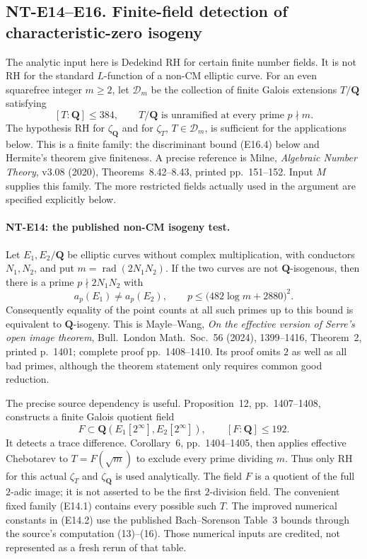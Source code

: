 \subsection*{NT-E14--E16. Finite-field detection of characteristic-zero isogeny}

The analytic input here is Dedekind RH for certain finite
number fields. It is not RH for the standard $L$-function
of a non-CM elliptic curve.
For an even squarefree integer $m\ge2$, let
$\mathcal D_m$ be the collection of finite Galois
extensions $T/\mathbf Q$ satisfying
\[
 [T:\mathbf Q]\le384,\qquad
 T/\mathbf Q\text{ is unramified at every prime }p\nmid m.
 \tag{E14.1}
\]
The hypothesis RH for $\zeta_{\mathbf Q}$ and for
$\zeta_T$, $T\in\mathcal D_m$, is sufficient for the
applications below. This is a finite family: the
discriminant bound (E16.4) below and Hermite's theorem
give finiteness. A precise reference is Milne,
\emph{Algebraic Number Theory}, v3.08 (2020),
Theorems~8.42--8.43, printed pp.~151--152.
Input $M$ supplies this family.
The more restricted fields actually used in the
argument are specified explicitly below.

\paragraph{NT-E14: the published non-CM isogeny test.}
Let $E_1,E_2/\mathbf Q$ be elliptic curves without
complex multiplication, with conductors $N_1,N_2$,
and put $m=\operatorname{rad}(2N_1N_2)$.
If the two curves are not $\mathbf Q$-isogenous,
then there is a prime $p\nmid2N_1N_2$ with
\[
 a_p(E_1)\ne a_p(E_2),\qquad
 p\le \bigl(482\log m+2880\bigr)^2.
 \tag{E14.2}
\]
Consequently equality of the point counts at all
such primes up to this bound is equivalent to
$\mathbf Q$-isogeny.
This is Mayle--Wang, \emph{On the effective version
of Serre's open image theorem},
Bull.\ London Math.\ Soc.~56 (2024), 1399--1416,
Theorem~2, printed p.~1401; complete proof
pp.~1408--1410. Its proof omits $2$ as well as all
bad primes, although the theorem statement only
requires common good reduction.

The precise source dependency is useful. Proposition~12,
pp.~1407--1408, constructs a finite Galois quotient field
\[
 F\subset\mathbf Q(E_1[2^\infty],E_2[2^\infty]),
                      \qquad [F:\mathbf Q]\le192.
 \tag{E14.3}
\]
It detects a trace difference. Corollary~6,
pp.~1404--1405, then applies effective Chebotarev to
$T=F(\sqrt m)$ to exclude every prime dividing $m$.
Thus only RH for this actual $\zeta_T$ and
$\zeta_{\mathbf Q}$ is used analytically.
The field $F$ is a quotient of the full $2$-adic image;
it is not asserted to be the first $2$-division field.
The convenient fixed family (E14.1) contains every
possible such $T$. The improved numerical constants
in (E14.2) use the published Bach--Sorenson Table~3
bounds through the source's computation
(13)--(16). Those numerical inputs are credited,
not represented as a fresh rerun of that table.


